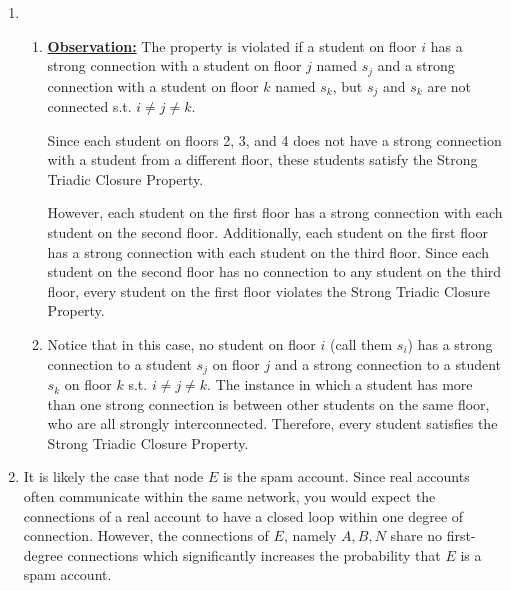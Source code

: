 \documentclass{article}
\begin{document}
\begin{enumerate}
    \item 
    \begin{enumerate}
        \item 
        \textbf{\underline{Observation:}} The property is violated if a student on floor $i$ has a strong connection with a student on floor $j$ named $s_j$ and a strong connection with a student on floor $k$ named $s_k$, but $s_j$ and $s_k$ are not connected s.t. $i\not=j\not=k$. 
        
        Since each student on floors 2, 3, and 4 does not have a strong connection with a student from a different floor, these students satisfy the Strong Triadic Closure Property. 

        However, each student on the first floor has a strong connection with each student on the second floor. Additionally, each student on the first floor has a strong connection with each student on the third floor. Since each student on the second floor has no connection to any student on the third floor, every student on the first floor violates the Strong Triadic Closure Property.

        \item Notice that in this case, no student on floor $i$ (call them $s_i$) has a strong connection to a student $s_j$ on floor $j$ and a strong connection to a student $s_k$ on floor $k$ s.t. $i\not=j\not=k$. The instance in which a student has more than one strong connection is between other students on the same floor, who are all strongly interconnected. Therefore, every student satisfies the Strong Triadic Closure Property.
    \end{enumerate}

    \item It is likely the case that node $E$ is the spam account. Since real accounts often communicate within the same network, you would expect the connections of a real account to have a closed loop within one degree of connection. However, the connections of $E$, namely $A,B,N$ share no first-degree connections which significantly increases the probability that $E$ is a spam account.
\end{enumerate}
\end{document}
